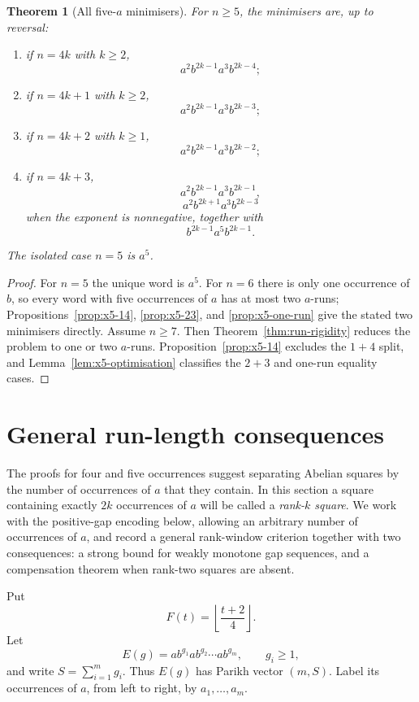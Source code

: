 \documentclass[11pt]{article}
\newtheorem{theorem}{Theorem}[section]
\theoremstyle{definition}
\begin{document}
\begin{theorem}[All five-$a$ minimisers]\label{thm:x5-classification}
For $n\ge5$, the minimisers are, up to reversal:
\begin{enumerate}[label=\textup{(\roman*)}]
\item if $n=4k$ with $k\ge2$,
\[
 a^2b^{2k-1}a^3b^{2k-4};
\]
\item if $n=4k+1$ with $k\ge2$,
\[
 a^2b^{2k-1}a^3b^{2k-3};
\]
\item if $n=4k+2$ with $k\ge1$,
\[
 a^2b^{2k-1}a^3b^{2k-2};
\]
\item if $n=4k+3$,
\[
 a^2b^{2k-1}a^3b^{2k-1},
\]
\[
 a^2b^{2k+1}a^3b^{2k-3}
\]
when the exponent is nonnegative, together with
\[
 b^{2k-1}a^5b^{2k-1}.
\]
\end{enumerate}
The isolated case $n=5$ is $a^5$.
\end{theorem}

\begin{proof}
For $n=5$ the unique word is $a^5$. For $n=6$ there is only one occurrence of $b$, so every word with five occurrences of $a$ has at most two $a$-runs; Propositions~\ref{prop:x5-14}, \ref{prop:x5-23}, and \ref{prop:x5-one-run} give the stated two minimisers directly. Assume $n\ge7$. Then Theorem~\ref{thm:run-rigidity} reduces the problem to one or two $a$-runs. Proposition~\ref{prop:x5-14} excludes the $1+4$ split, and Lemma~\ref{lem:x5-optimisation} classifies the $2+3$ and one-run equality cases.
\end{proof}

\section{General run-length consequences}\label{sec:general-run-length}

The proofs for four and five occurrences suggest separating Abelian squares by the number of occurrences of $a$ that they contain.  In this section a square containing exactly $2k$ occurrences of $a$ will be called a \emph{rank-$k$ square}.  We work with the positive-gap encoding below, allowing an arbitrary number of occurrences of $a$, and record a general rank-window criterion together with two consequences: a strong bound for weakly monotone gap sequences, and a compensation theorem when rank-two squares are absent.

Put
\[
 F(t)=\left\lfloor\frac{t+2}{4}\right\rfloor.
\]
Let
\[
 E(g)=ab^{g_1}ab^{g_2}\cdots ab^{g_m},
 \qquad g_i\ge1,
\]
and write $S=\sum_{i=1}^m g_i$.  Thus $E(g)$ has Parikh vector $(m,S)$.  Label its occurrences of $a$, from left to right, by $a_1,\ldots,a_m$.
\end{document}
